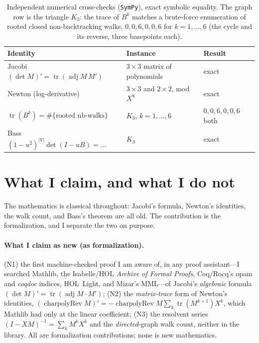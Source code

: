 \documentclass[11pt]{article}
\newcommand{\tr}{\operatorname{tr}}
\newcommand{\adj}{\operatorname{adj}}
\DeclareMathOperator{\charpolyRev}{charpolyRev}
\begin{document}
\begin{table}[h]
\centering\footnotesize
\caption{Independent numerical cross-checks (\texttt{SymPy}), exact symbolic equality. The graph row
is the triangle $K_3$: the trace of $B^k$ matches a brute-force enumeration of rooted closed
non-backtracking walks, $0,0,6,0,0,6$ for $k=1,\dots,6$ (the cycle and its reverse, three basepoints
each).}
\label{tab:checks}
\begin{tabular}{@{}lll@{}}
\toprule
\rowcolor{ggteal}
{\color{white}\textbf{Identity}} & {\color{white}\textbf{Instance}} & {\color{white}\textbf{Result}}\\
\midrule
Jacobi $(\det M)'=\tr(\adj M\,M')$ & $3\times3$ matrix of polynomials & exact\\
Newton (log-derivative) & $3\times3$ and $2\times2$, mod $X^8$ & exact\\
$\tr(B^k)=\#\{\text{rooted nb-walks}\}$ & $K_3$, $k=1,\dots,6$ & $0,0,6,0,0,6$ both\\
Bass $(1{-}u^2)^{|V|}\det(I{-}uB)=\dots$ & $K_3$ & exact\\
\bottomrule
\end{tabular}
\end{table}

\section{What I claim, and what I do not}
\label{sec:limits}

The mathematics is classical throughout: Jacobi's formula, Newton's identities, the walk count, and
Bass's theorem are all old. The contribution is the formalization, and I separate the two on purpose.

\paragraph{What I claim as new (as formalization).}
(N1) the first machine-checked proof I am aware of, in any proof assistant---I searched Mathlib,
the Isabelle/HOL \emph{Archive of Formal Proofs}, Coq/Rocq's opam and \emph{coqdoc} indices,
HOL~Light, and Mizar's MML---of Jacobi's \emph{algebraic} formula $(\det M)'=\tr(\adj M\cdot M')$; (N2) the \emph{matrix-trace} form of
Newton's identities, $(\charpolyRev M)'=-\charpolyRev M\sum_k\tr(M^{k+1})X^k$, which Mathlib had only
at the linear coefficient; (N3) the resolvent series $(I-XM)^{-1}=\sum_k M^kX^k$ and the
\emph{directed}-graph walk count, neither in the library. All are formalization contributions; none
is new mathematics.
\end{document}

